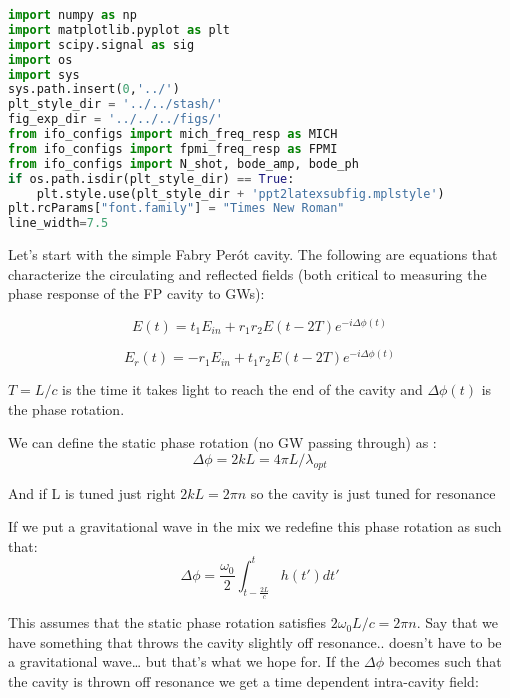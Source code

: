 \begin{spacing}{1.2} \begin{lstlisting}[frame=single, language=Python]
import numpy as np 
import matplotlib.pyplot as plt
import scipy.signal as sig
import os
import sys
sys.path.insert(0,'../')
plt_style_dir = '../../stash/'
fig_exp_dir = '../../../figs/'
from ifo_configs import mich_freq_resp as MICH
from ifo_configs import fpmi_freq_resp as FPMI
from ifo_configs import N_shot, bode_amp, bode_ph
if os.path.isdir(plt_style_dir) == True:
    plt.style.use(plt_style_dir + 'ppt2latexsubfig.mplstyle')
plt.rcParams["font.family"] = "Times New Roman"
line_width=7.5
\end{lstlisting} \end{spacing}

\noindent Let's start with the simple Fabry Perót cavity. The following are
equations that characterize the circulating and reflected fields (both
critical to measuring the phase response of the FP cavity to GWs):

\begin{equation}\label{eq:fpmi1}
E(t) = t_1 E_{in} + r_1 r_2 E(t - 2T) e^{-i \Delta \phi(t)} 
\end{equation}

\begin{equation}\label{eq:fpmi2}
E_r(t) = -r_1 E_{in} + t_1 r_2 E(t - 2T) e^{-i \Delta \phi(t)}
\end{equation}

\noindent \(T = L/c\) is the time it takes light to reach the end of the cavity
and \(\Delta \phi(t)\) is the phase rotation.

\noindent We can define the static phase rotation (no GW passing through) as :
\begin{equation}\Delta \phi = 2kL = 4 \pi L /\lambda_{opt}  \end{equation}

\noindent And if L is tuned just right \(2kL = 2 \pi n\) so the cavity is just
tuned for resonance

\noindent If we put a gravitational wave in the mix we redefine this phase
rotation as such that:
\begin{equation}\Delta \phi =  \frac{\omega_0}{2} \int_{t-\frac{2L}{c}}^{t} h(t')dt' \end{equation}

\noindent This assumes that the static phase rotation satisfies \(2\omega_0L/c = 2 \pi n\). 
\noindent Say that we have something that throws the cavity slightly off resonance.. doesn't have to be a gravitational wave\ldots{} but that's what we hope for.
\noindent If the \(\Delta \phi\) becomes such that the cavity is thrown off resonance we get a time dependent intra-cavity field:

